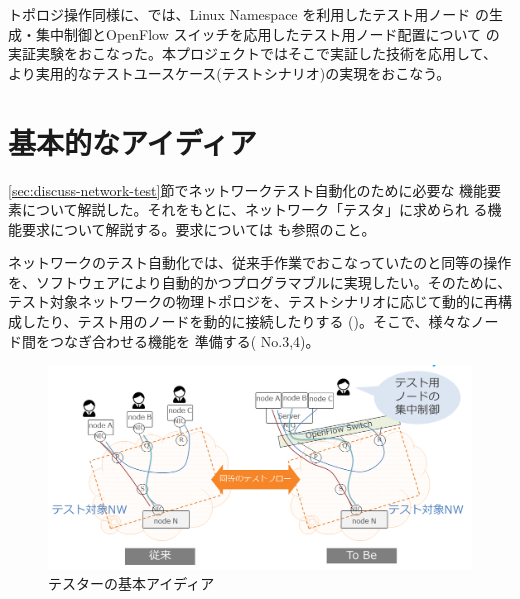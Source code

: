 トポロジ操作同様に、\lopj では、Linux Namespace を利用したテスト用ノード
の生成・集中制御とOpenFlow スイッチを応用したテスト用ノード配置について
の実証実験をおこなった。本プロジェクトではそこで実証した技術を応用して、
より実用的なテストユースケース(テストシナリオ)の実現をおこなう。

 \section{基本的なアイディア}
 \label{sec:basic-tester-idea}



\ref{sec:discuss-network-test}節でネットワークテスト自動化のために必要な
機能要素について解説した。それをもとに、ネットワーク「テスタ」に求められ
る機能要求について解説する。要求については \lopjtech も参照のこと。

ネットワークのテスト自動化では、従来手作業でおこなっていたのと同等の操作
を、ソフトウェアにより自動的かつプログラマブルに実現したい。そのために、
テスト対象ネットワークの物理トポロジを、テストシナリオに応じて動的に再構
成したり、テスト用のノードを動的に接続したりする
()。そこで、様々なノード間をつなぎ合わせる機能を
準備する( No.3,4)。

\begin{figure}[h]
 \centering
 \includegraphics[scale=0.5]{img/basic-idea.png}
 \caption{テスターの基本アイディア}
 \label{fig:basic-idea}
\end{figure}

